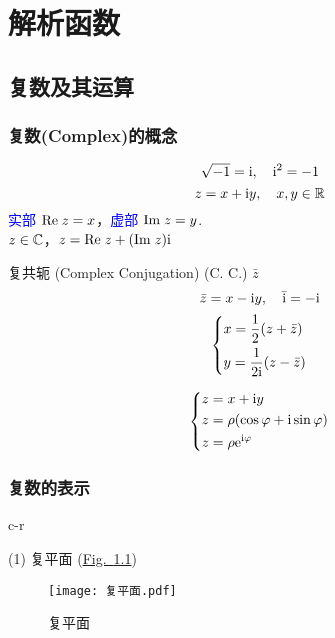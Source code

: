 \documentclass[12pt, a4paper, oneside, UTF8]{ctexbook}
\begin{document}
% 
\else
\fi

\chapter{解析函数}

\section{复数及其运算}

\subsection{复数(Complex)的概念}

\[ \sqrt{-1}=\mathrm{i},\quad{\mathrm{i}}^2=-1 \]
\[z = x + \mathrm{i} y,\quad x,y\in \mathbb{R} \]
\textcolor{blue}{实部} $\mathrm{Re}\;z = x$，\textcolor{blue}{虚部} $\mathrm{Im}\;z = y$.\\
$z\in\mathbb{C}$，$z=\mathrm{Re}\;z+(\mathrm{Im}\;z) \mathrm{i}$

复共轭 (Complex Conjugation) (C. C.) $\bar{z}$
\[\bar{z} = x - \mathrm{i} y,\quad \bar{\mathrm{i}} =-\mathrm{i}\]
\begin{equation} \label{eq:共轭关系}
    \left\{ 
    \begin{lgathered} 
        x = \frac{1}{2}(z + \bar{z})\\ 
        y = \frac{1}{2\mi}(z - \bar{z}) 
    \end{lgathered}   
    \right.
\end{equation}

\begin{equation*}
    \left\{ 
    \begin{lgathered} 
        z = x + \mi y\\ 
        z = \rho (\cos \varphi + \mi \sin \varphi)\\
        z = \rho \me^{\mi\varphi}
    \end{lgathered}   
    \right.
\end{equation*}

\subsection{复数的表示}c-r

\noindent (1) 复平面 (\hyperref[fig:复平面]{Fig.~\ref{fig:复平面}})
\begin{figure}
    \centering
    \texttt{[image: 复平面.pdf]}
    \caption{\label{fig:复平面} 复平面}
\end{figure}
\end{document}
